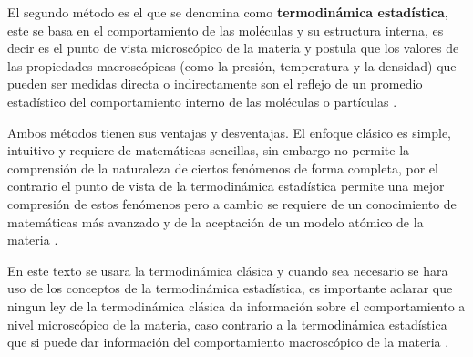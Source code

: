\documentclass[master.tex]{subfiles}
\begin{document}
    El segundo método es el que se denomina como \textbf{termodinámica estadística}, este se basa en el comportamiento de las moléculas y su estructura interna, es decir es el punto de vista microscópico de la materia y postula que los valores de las propiedades macroscópicas (como la presión, temperatura y la densidad) que pueden ser medidas directa o indirectamente son el reflejo de un promedio estadístico del comportamiento interno de las moléculas o partículas \parencites{faires}{wark}.

    Ambos métodos tienen sus ventajas y desventajas. El enfoque clásico es simple, intuitivo y requiere de matemáticas sencillas, sin embargo no permite la comprensión de la naturaleza de ciertos fenómenos de forma completa, por el contrario el punto de vista de la termodinámica estadística permite una mejor compresión de estos fenómenos pero a cambio se requiere de un conocimiento de matemáticas más avanzado y de la aceptación de un modelo atómico de la materia \parencite{faires}. 

    En este texto se usara la termodinámica clásica y cuando sea necesario se hara uso de los conceptos de la termodinámica estadística, es importante aclarar que ningun ley de la termodinámica clásica da información sobre el comportamiento a nivel microscópico de la materia, caso contrario a la termodinámica estadística que si puede dar información del comportamiento macroscópico de la materia \parencite{smith-vanness}.

    

\printbibliography[title=Bibliografía del capítulo]
    
\end{document}
